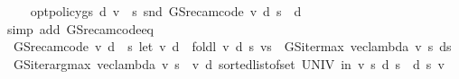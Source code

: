\begin{isabellebody}
\ \ \isamarkupfalse%
\ {}{\isacharcolon}{\kern0pt}\ {\isachardoublequoteopen}opt{\isacharunderscore}{\kern0pt}policy{\isacharunderscore}{\kern0pt}gs{\isacharprime}{\kern0pt}\ d\ v\ {\isacharequal}{\kern0pt}\ {\isacharparenleft}{\kern0pt}{\isasymlambda}s{\isachardot}{\kern0pt}\ snd\ {\isacharparenleft}{\kern0pt}GS{\isacharunderscore}{\kern0pt}rec{\isacharunderscore}{\kern0pt}am{\isacharunderscore}{\kern0pt}code\ v\ d\ s{\isacharparenright}{\kern0pt}{\isacharparenright}{\kern0pt}{\isachardoublequoteclose}\ \ d\isanewline
\ \ \ \ \isamarkupfalse%
\ {\isacharparenleft}{\kern0pt}simp\ add{\isacharcolon}{\kern0pt}\ GS{\isacharunderscore}{\kern0pt}rec{\isacharunderscore}{\kern0pt}am{\isacharunderscore}{\kern0pt}code{\isacharunderscore}{\kern0pt}eq{\isacharparenright}{\kern0pt}\isanewline
\ \ \isamarkupfalse%
\ {}{\isacharcolon}{\kern0pt}\ {\isachardoublequoteopen}GS{\isacharunderscore}{\kern0pt}rec{\isacharunderscore}{\kern0pt}am{\isacharunderscore}{\kern0pt}code\ v\ d\ {\isacharequal}{\kern0pt}\ {\isacharparenleft}{\kern0pt}{\isasymlambda}s{\isacharprime}{\kern0pt}{\isachardot}{\kern0pt}\ let\ {\isacharparenleft}{\kern0pt}v{\isacharprime}{\kern0pt}{\isacharcomma}{\kern0pt}\ d{\isacharprime}{\kern0pt}{\isacharparenright}{\kern0pt}\ {\isacharequal}{\kern0pt}\ foldl\ {\isacharparenleft}{\kern0pt}{\isasymlambda}{\isacharparenleft}{\kern0pt}v{\isacharcomma}{\kern0pt}\ d{\isacharparenright}{\kern0pt}\ s{\isachardot}{\kern0pt}\ {\isacharparenleft}{\kern0pt}v{\isacharparenleft}{\kern0pt}s\ {\isacharcolon}{\kern0pt}{\isacharequal}{\kern0pt}\ GS{\isacharunderscore}{\kern0pt}iter{\isacharunderscore}{\kern0pt}max\ {\isacharparenleft}{\kern0pt}vec{\isacharunderscore}{\kern0pt}lambda\ v{\isacharparenright}{\kern0pt}\ s{\isacharparenright}{\kern0pt}{\isacharcomma}{\kern0pt}\ d{\isacharparenleft}{\kern0pt}s\ {\isacharcolon}{\kern0pt}{\isacharequal}{\kern0pt}\ GS{\isacharunderscore}{\kern0pt}iter{\isacharunderscore}{\kern0pt}arg{\isacharunderscore}{\kern0pt}max\ {\isacharparenleft}{\kern0pt}vec{\isacharunderscore}{\kern0pt}lambda\ v{\isacharparenright}{\kern0pt}\ s{\isacharparenright}{\kern0pt}{\isacharparenright}{\kern0pt}{\isacharparenright}{\kern0pt}\ {\isacharparenleft}{\kern0pt}{\isacharparenleft}{\kern0pt}{\isachardollar}{\kern0pt}{\isacharparenright}{\kern0pt}\ v{\isacharcomma}{\kern0pt}\ d{\isacharparenright}{\kern0pt}\ {\isacharparenleft}{\kern0pt}sorted{\isacharunderscore}{\kern0pt}list{\isacharunderscore}{\kern0pt}of{\isacharunderscore}{\kern0pt}set\ UNIV{\isacharparenright}{\kern0pt}\ in\ {\isacharparenleft}{\kern0pt}v{\isacharprime}{\kern0pt}\ s{\isacharprime}{\kern0pt}{\isacharcomma}{\kern0pt}\ d{\isacharprime}{\kern0pt}\ s{\isacharprime}{\kern0pt}{\isacharparenright}{\kern0pt}{\isacharparenright}{\kern0pt}{\isachardoublequoteclose}\ \ d\ s\ v\isanewline

\end{isabellebody}
